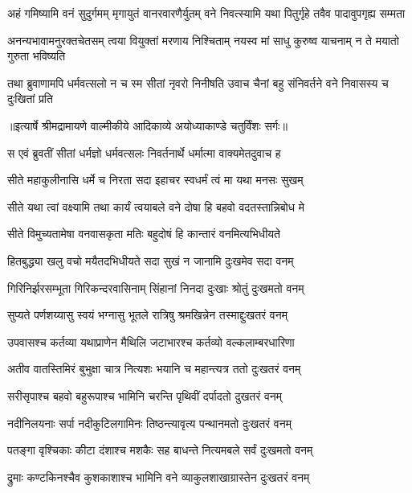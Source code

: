 \fourlineindentedshloka
{अहं गमिष्यामि वनं सुदुर्गमम्}
{मृगायुतं वानरवारणैर्युतम्}
{वने निवत्स्यामि यथा पितुर्गृहे}
{तवैव पादावुपगृह्य सम्मता} %

\fourlineindentedshloka
{अनन्यभावामनुरक्तचेतसम्}
{त्वया वियुक्तां मरणाय निश्चिताम्}
{नयस्व मां साधु कुरुष्व याचनाम्}
{न ते मयातो गुरुता भविष्यति} %

\fourlineindentedshloka
{तथा ब्रुवाणामपि धर्मवत्सलो}
{न च स्म सीतां नृवरो निनीषति}
{उवाच चैनां बहु संनिवर्तने}
{वने निवासस्य च दुःखितां प्रति} %


{॥इत्यार्षे श्रीमद्रामायणे वाल्मीकीये आदिकाव्ये अयोध्याकाण्डे चतुर्विंशः सर्गः॥}


\twolineshloka
{स एवं ब्रुवतीं सीतां धर्मज्ञो धर्मवत्सलः}
{निवर्तनार्थे धर्मात्मा वाक्यमेतदुवाच ह} %

\twolineshloka
{सीते महाकुलीनासि धर्मे च निरता सदा}
{इहाचर स्वधर्मं त्वं मा यथा मनसः सुखम्} %

\twolineshloka
{सीते यथा त्वां वक्ष्यामि तथा कार्यं त्वयाबले}
{वने दोषा हि बहवो वदतस्तान्निबोध मे} %

\twolineshloka
{सीते विमुच्यतामेषा वनवासकृता मतिः}
{बहुदोषं हि कान्तारं वनमित्यभिधीयते} %

\twolineshloka
{हितबुद्ध्या खलु वचो मयैतदभिधीयते}
{सदा सुखं न जानामि दुःखमेव सदा वनम्} %

\twolineshloka
{गिरिनिर्झरसम्भूता गिरिकन्दरवासिनाम्}
{सिंहानां निनदा दुःखाः श्रोतुं दुःखमतो वनम्} %

\twolineshloka
{सुप्यते पर्णशय्यासु स्वयं भग्नासु भूतले}
{रात्रिषु श्रमखिन्नेन तस्माद्दुःखतरं वनम्} %

\twolineshloka
{उपवासश्च कर्तव्या यथाप्राणेन मैथिलि}
{जटाभारश्च कर्तव्यो वल्कलाम्बरधारिणा} %

\twolineshloka
{अतीव वातस्तिमिरं बुभुक्षा चात्र नित्यशः}
{भयानि च महान्त्यत्र ततो दुःखतरं वनम्} %

\twolineshloka
{सरीसृपाश्च बहवो बहुरूपाश्च भामिनि}
{चरन्ति पृथिवीं दर्पादतो दुखतरं वनम्} %

\twolineshloka
{नदीनिलयनाः सर्पा नदीकुटिलगामिनः}
{तिष्ठन्त्यावृत्य पन्थानमतो दुःखतरं वनम्} %

\twolineshloka
{पतङ्गा वृश्चिकाः कीटा दंशाश्च मशकैः सह}
{बाधन्ते नित्यमबले सर्वं दुःखमतो वनम्} %

\twolineshloka
{द्रुमाः कण्टकिनश्चैव कुशकाशाश्च भामिनि}
{वने व्याकुलशाखाग्रास्तेन दुःखतरं वनम्} %

